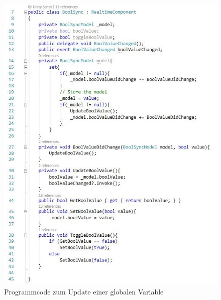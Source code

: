 \documentclass[a4paper,11pt]{article}%
\renewcommand{\\}{\vspace*{0.5\baselineskip} \newline}
\begin{document}
\begin{figure}[H]
		\begin{footnotesize}
			\includegraphics[scale=.75]{Abbildungen/boolValueChanged.jpg}
			
			\caption[Abbildung 1]{Programmcode zum Update einer globalen Variable}
			\label{boolSync}
		\end{footnotesize}
	\end{figure}

\newpage	
\end{document}
